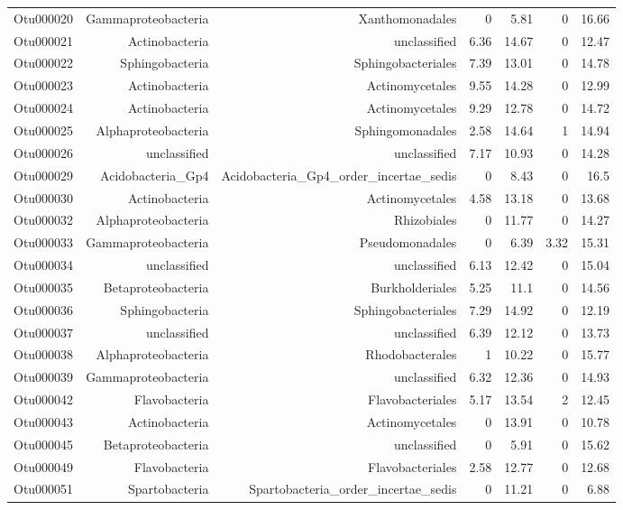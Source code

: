 \begin{table}[ht]
\begin{tabular}{crrrrrr}
  Otu000020 & Gammaproteobacteria & Xanthomonadales & 0 & 5.81 & 0 & 16.66 \\ 
  Otu000021 & Actinobacteria & unclassified & 6.36 & 14.67 & 0 & 12.47 \\ 
  Otu000022 & Sphingobacteria & Sphingobacteriales & 7.39 & 13.01 & 0 & 14.78 \\ 
  Otu000023 & Actinobacteria & Actinomycetales & 9.55 & 14.28 & 0 & 12.99 \\ 
  Otu000024 & Actinobacteria & Actinomycetales & 9.29 & 12.78 & 0 & 14.72 \\ 
  Otu000025 & Alphaproteobacteria & Sphingomonadales & 2.58 & 14.64 & 1 & 14.94 \\ 
  Otu000026 & unclassified & unclassified & 7.17 & 10.93 & 0 & 14.28 \\ 
  Otu000029 & Acidobacteria\_Gp4 & Acidobacteria\_Gp4\_order\_incertae\_sedis & 0 & 8.43 & 0 & 16.5 \\ 
  Otu000030 & Actinobacteria & Actinomycetales & 4.58 & 13.18 & 0 & 13.68 \\ 
  Otu000032 & Alphaproteobacteria & Rhizobiales & 0 & 11.77 & 0 & 14.27 \\ 
  Otu000033 & Gammaproteobacteria & Pseudomonadales & 0 & 6.39 & 3.32 & 15.31 \\ 
  Otu000034 & unclassified & unclassified & 6.13 & 12.42 & 0 & 15.04 \\ 
  Otu000035 & Betaproteobacteria & Burkholderiales & 5.25 & 11.1 & 0 & 14.56 \\ 
  Otu000036 & Sphingobacteria & Sphingobacteriales & 7.29 & 14.92 & 0 & 12.19 \\ 
  Otu000037 & unclassified & unclassified & 6.39 & 12.12 & 0 & 13.73 \\ 
  Otu000038 & Alphaproteobacteria & Rhodobacterales & 1 & 10.22 & 0 & 15.77 \\ 
  Otu000039 & Gammaproteobacteria & unclassified & 6.32 & 12.36 & 0 & 14.93 \\ 
  Otu000042 & Flavobacteria & Flavobacteriales & 5.17 & 13.54 & 2 & 12.45 \\ 
  Otu000043 & Actinobacteria & Actinomycetales & 0 & 13.91 & 0 & 10.78 \\ 
  Otu000045 & Betaproteobacteria & unclassified & 0 & 5.91 & 0 & 15.62 \\ 
  Otu000049 & Flavobacteria & Flavobacteriales & 2.58 & 12.77 & 0 & 12.68 \\ 
  Otu000051 & Spartobacteria & Spartobacteria\_order\_incertae\_sedis & 0 & 11.21 & 0 & 6.88 \\ 

\end{tabular}
\end{table}
